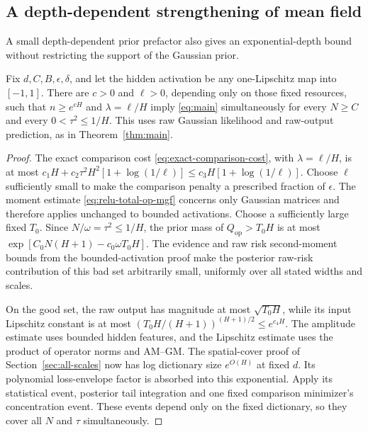 \subsection{A depth-dependent strengthening of mean field}
\label{sec:depth-normalized}
A small depth-dependent prior prefactor also gives an exponential-depth bound without restricting the support of the Gaussian prior.

\begin{corollary}
\label{cor:depth-normalized}
Fix $d,C,B,\epsilon,\delta$, and let the hidden activation be any one-Lipschitz map into $[-1,1]$. There are $c>0$ and $\ell>0$, depending only on those fixed resources, such that $n\ge e^{cH}$ and $\lambda=\ell/H$ imply \eqref{eq:main} simultaneously for every $N\ge C$ and every $0<\tau^2\le1/H$. This uses raw Gaussian likelihood and raw-output prediction, as in Theorem~\ref{thm:main}.
\end{corollary}

\begin{proof}
The exact comparison cost \eqref{eq:exact-comparison-cost}, with $\lambda=\ell/H$, is at most
$c_1H+c_2\tau^2H^2[1+\log(1/\ell)]\le c_3H[1+\log(1/\ell)]$.
Choose $\ell$ sufficiently small to make the comparison penalty a prescribed fraction of $\epsilon$.
The moment estimate \eqref{eq:relu-total-op-mgf} concerns only Gaussian matrices and therefore applies unchanged to bounded activations. Choose a sufficiently large fixed $T_0$. Since $N/\omega=\tau^2\le1/H$, the prior mass of $Q_{\mathrm{op}}>T_0H$ is at most
$\exp[C_0N(H+1)-c_0\omega T_0H]$.
The evidence and raw risk second-moment bounds from the bounded-activation proof make the posterior raw-risk contribution of this bad set arbitrarily small, uniformly over all stated widths and scales.

On the good set, the raw output has magnitude at most $\sqrt{T_0H}$, while its input Lipschitz constant is at most
$(T_0H/(H+1))^{(H+1)/2}\le e^{c_4H}$.
The amplitude estimate uses bounded hidden features, and the Lipschitz estimate uses the product of operator norms and AM--GM. The spatial-cover proof of Section~\ref{sec:all-scales} now has log dictionary size $e^{O(H)}$ at fixed $d$. Its polynomial loss-envelope factor is absorbed into this exponential. Apply its statistical event, posterior tail integration and one fixed comparison minimizer's concentration event. These events depend only on the fixed dictionary, so they cover all $N$ and $\tau$ simultaneously.
\end{proof}

